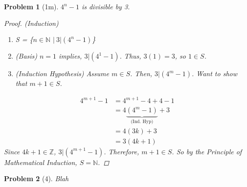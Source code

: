 \documentclass{article}
\theoremstyle{problem}
\newtheorem{prob}{Problem}
\theoremstyle{plain}
\begin{document}
  \begin{prob}[1m]
    $4^n - 1$ is divisible by 3.
    \begin{proof}(Induction) 
      \begin{enumerate}
      \item S = \{$n \in \mathbb{N}$ $|\ 3 | (4^n - 1)$\}
      \item (Basis) $n = 1$ implies, $3 | (4^1 - 1)$. Thus, $3(1) = 3$, so $1 \in S$.
      \item (Induction Hypothesis) Assume $m \in S$. Then, $3 | (4^m - 1)$. Want to show that $m + 1 \in S$.
      \end{enumerate}
      \begin{align*}
        4^{m+1} - 1 &= 4^{m+1} - 4 + 4 - 1\\
        &= 4\underbrace{(4^m - 1)}_{\text{(Ind. Hyp)}} + 3\\
        &= 4(3k) + 3\\
        &= 3(4k + 1)
      \end{align*}
      Since $4k + 1 \in \mathbb{Z}$, $3 | (4^{m+1} - 1)$. Therefore, $m+1 \in S$. So by the Principle of Mathematical Induction, $S = \mathbb{N}$.
    \end{proof}
  \end{prob}

  \begin{prob}[4]
    Blah
  \end{prob}
\end{document}
